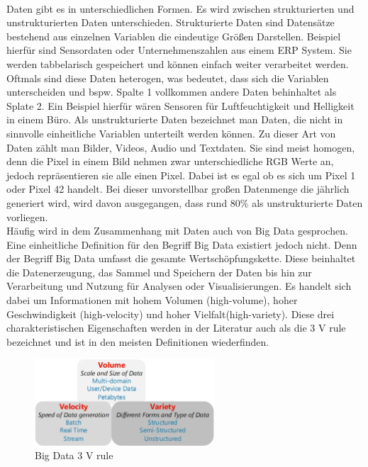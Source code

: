\begin{onehalfspace}
        \\
        Daten gibt es in unterschiedlichen Formen. Es wird zwischen strukturierten und unstrukturierten Daten unterschieden. Strukturierte Daten sind Datensätze bestehend aus einzelnen Variablen die eindeutige Größen Darstellen. Beispiel hierfür sind Sensordaten oder Unternehmenszahlen aus einem ERP System. Sie werden tabbelarisch gespeichert und können einfach weiter verarbeitet werden. Oftmals sind diese Daten heterogen, was bedeutet, dass sich die Variablen unterscheiden und bspw. Spalte 1 vollkommen andere Daten behinhaltet als Splate 2. Ein Beispiel hierfür wären Sensoren für Luftfeuchtigkeit und Helligkeit in einem Büro. Als unstrukturierte Daten bezeichnet man Daten, die nicht in sinnvolle einheitliche Variablen unterteilt werden können. Zu dieser Art von Daten zählt man Bilder, Videos, Audio und Textdaten. Sie sind meist homogen, denn die Pixel in einem Bild nehmen zwar unterschiedliche RGB Werte an, jedoch repräsentieren sie alle einen Pixel. Dabei ist es egal ob es sich um Pixel 1 oder Pixel 42 handelt.\cite{Horn2022} Bei dieser unvorstellbar großen Datenmenge die jährlich generiert wird, wird davon ausgegangen, dass rund 80\% als unstrukturierte Daten vorliegen.\cite{Otto2019}
        \\
        Häufig wird in dem Zusammenhang mit Daten auch von Big Data gesprochen. Eine einheitliche Definition für den Begriff Big Data existiert jedoch nicht. Denn der Begriff Big Data umfasst die gesamte Wertschöpfungskette. Diese beinhaltet die Datenerzeugung, das Sammel und Speichern der Daten bis hin zur Verarbeitung und Nutzung für Analysen oder Visualisierungen.\cite{Taleb2018}\cite{Faroukhi2020} Es handelt sich dabei um Informationen mit hohem Volumen (high-volume), hoher Geschwindigkeit (high-velocity) und hoher Vielfalt(high-variety). Diese drei charakteristischen Eigenschaften werden in der Literatur auch als die \glqq{}3 V rule\grqq{} bezeichnet und ist in den meisten Definitionen wiederfinden.\cite{Taleb2018}\cite{Yalaoui2021} 
        \begin{figure}[h]
            \centering
            \includegraphics[width = 6.7cm]{Bilder/3VRule.png}
            \caption{Big Data 3 V rule \cite{Taleb2018}}

\end{figure}
\end{onehalfspace}
